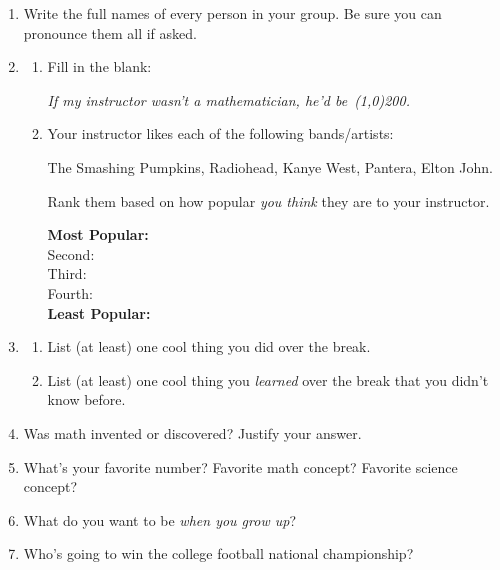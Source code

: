 \documentclass[12pt]{article}
\newcommand{\ti}[1]{\textit{#1}}
\begin{document}
\begin{enumerate}
	\item Write the full names of every person in your group. Be sure you can pronounce them all if asked.
	
	\item 
	\begin{enumerate}
		\item Fill in the blank:
			\begin{addmargin}[2mm]{0mm}
				\textit{If my instructor wasn't a mathematician, he'd be\,\,\,\line(1,0){200}.}
			\end{addmargin}\vspace{0.125in}
		\item Your instructor likes each of the following bands/artists:
			\begin{center}
				The Smashing Pumpkins, Radiohead, Kanye West, Pantera, Elton John.
			\end{center} 
		Rank them based on how popular \ti{you think} they are to your instructor. \begin{addmargin}[1em]{5in}\begin{flushright}\textbf{Most Popular:}\\[0.75mm]Second:\\[0.75mm] Third:\\[0.75mm] Fourth:\\[0.75mm]\textbf{Least Popular:}\end{flushright}\end{addmargin}
	\end{enumerate}
	
	\item 
	\begin{enumerate}
		\item List (at least) one cool thing you did over the break.\vspace{0.125in}
		\item List (at least) one cool thing you \ti{learned} over the break that you didn't know before.
	\end{enumerate}
	
	\item Was math invented or discovered? Justify your answer.
	
	\item What's your favorite number? Favorite math concept? Favorite science concept?
	
	\item What do you want to be \ti{when you grow up}?
	
	\item Who's going to win the college football national championship?
\end{enumerate}
\end{document}
